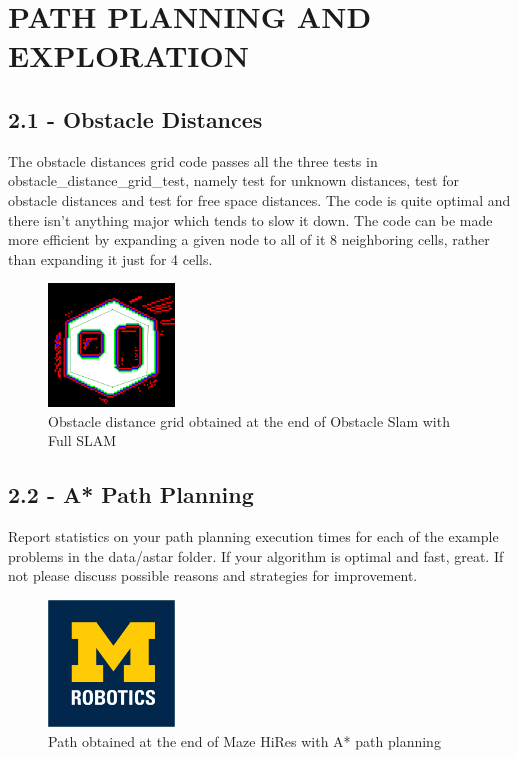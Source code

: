 \documentclass[journal,twocolumn]{IEEEtran}
\begin{document}
\section{PATH PLANNING AND EXPLORATION}

\subsection*{2.1 - Obstacle Distances} 

The obstacle distances grid code passes all the three tests in obstacle\_distance\_grid\_test, namely test for unknown distances, test for obstacle distances and test for free space distances. The code is quite optimal and there isn't anything major which tends to slow it down. The code can be made more efficient by expanding a given node to all of it 8 neighboring cells, rather than expanding it just for 4 cells.

\begin{figure}[H]
\centering
\includegraphics[width=0.3\textwidth]{Media/21.png}
\caption{Obstacle distance grid obtained at the end of Obstacle Slam with Full SLAM}
\end{figure}


\subsection*{2.2 - A* Path Planning} 

Report statistics on your path planning execution times for each of the example problems in the data/astar folder. If your algorithm is optimal and fast, great. If not please discuss possible reasons and strategies for improvement.

\begin{figure}[H]
\centering
\includegraphics[width=0.3\textwidth]{Media/template-robotics.jpg}
\caption{Path obtained at the end of Maze HiRes with A* path planning}
\end{figure}
\end{document}
